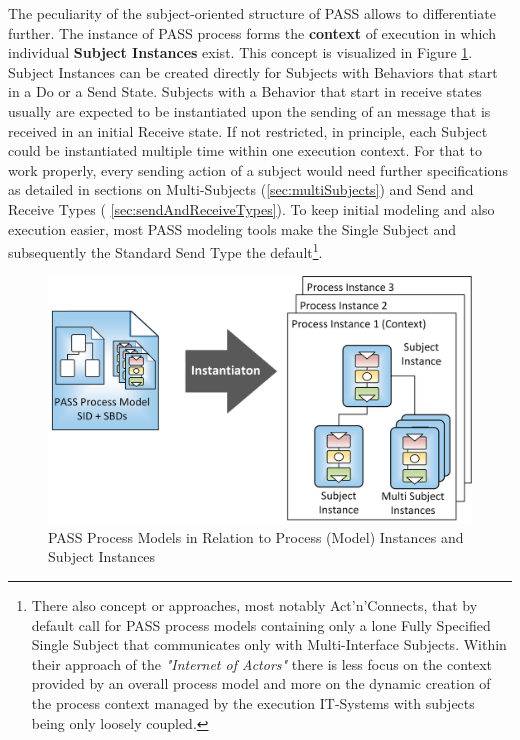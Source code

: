 The peculiarity of the subject-oriented structure of PASS allows to differentiate further. The instance of PASS process forms the \textbf{context} of execution in which individual \textbf{Subject Instances} exist. This concept is visualized in Figure \ref{fig:processModelInstance}. Subject Instances can be created directly for Subjects with Behaviors that start in a Do or a Send State. Subjects with a Behavior that start in receive states usually are expected to be instantiated upon the sending of an message that is received in an initial Receive state. If not restricted, in principle, each Subject could be instantiated multiple time within one execution context. For that to work properly, every sending action of a subject would need further specifications as detailed in sections on Multi-Subjects (\ref{sec:multiSubjects}) and Send and Receive Types ( \ref{sec:sendAndReceiveTypes}). To keep initial modeling and also execution easier, most PASS modeling tools make the Single Subject and subsequently the Standard Send Type the default\footnote{There also concept or approaches, most notably Act'n'Connects, that by default call for PASS process models containing only a lone Fully Specified Single Subject that communicates only with Multi-Interface Subjects. Within their approach of the \textit{"Internet of Actors"} there is less focus on the context provided by an overall process model and more on the dynamic creation of the process context managed by the execution IT-Systems with subjects being only loosely coupled.}.

\begin{figure}[htbp]
	\centering
	\includegraphics[width=0.9\linewidth]{Figures/PASSExecutionConceptModelAndInstance.png}
	\caption[PASS Process Models in Relation to Process (Model) Instances and Subject Instances]{PASS Process Models in Relation to Process (Model) Instances and Subject Instances}
	\label{fig:processModelInstance}
\end{figure}


